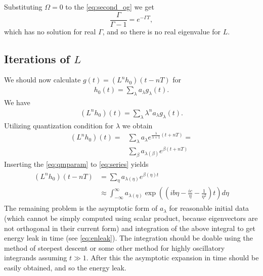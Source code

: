 \documentclass[
a4paper,%
10pt,%
titlepage,%
twoside%
]{article}
\begin{document}
Substituting $\Omega=0$ to the \eqref{eq:second_og} we get
\begin{equation}
  \label{eq:omega0}
  \frac{\Gamma}{\Gamma-1}=e^{-\Gamma T},
\end{equation}
which has no solution for real $\Gamma$, and so there is no real
eigenvalue for $L$.


\subsection{Iterations of $L$}

We should now calculate $g(t)=(L^n h_0)(t-nT)$ for
\begin{gather}
  h_0(t)=\sum_\lambda a_\lambda g_\lambda(t).
\end{gather}
We have
\begin{gather}
  (L^n h_0)(t)=\sum_\lambda \lambda^n a_\lambda g_\lambda(t).
\end{gather}
Utilizing quantization condition for $\lambda$ we obtain
\begin{align}\label{eq:series}
  (L^n h_0)(t) =&\sum_\lambda a_\lambda e^{\frac{\lambda}{\lambda+1}(t+nT)}=\\
  &\sum_\beta a_{\lambda(\beta)}e^{\beta(t+nT)}
  \end{align}
Inserting the \eqref{eq:qmparam} to \eqref{eq:series} yields
\begin{gather}
  \begin{split}
    (L^n h_0)(t-nT) &=\sum_\eta a_{\lambda(\eta)} e^{\beta(\eta)t}\\
    &\approx \int_{-\infty}^\infty a_{\lambda(\eta)}\exp((ib\eta-\frac{ic}{\eta}-\frac{1}{\eta^2})t)d\eta
  \end{split}
\end{gather}
The remaining problem is the asymptotic form of $a_{\lambda}$ for
reasonable initial data (which cannot be simply computed using scalar
product, because eigenvectors are not orthogonal in their current
form) and integration of the above integral to get energy leak in time
(see \eqref{eq:enleak}). The integration should be doable using the
method of steepest descent or some other method for highly oscillatory
integrands assuming $t\gg 1$. After this the asymptotic expansion in
time should be easily obtained, and so the energy leak.


\end{document}
